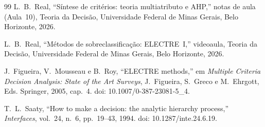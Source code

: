 \documentclass[conference]{IEEEtran}
\begin{document}
\begin{thebibliography}{99}
L.~B.~Real, ``Síntese de critérios: teoria multiatributo e AHP,'' notas de aula (Aula~10), Teoria da Decisão, Universidade Federal de Minas Gerais, Belo Horizonte, 2026.

L.~B.~Real, ``Métodos de sobreclassificação: ELECTRE~I,'' videoaula, Teoria da Decisão, Universidade Federal de Minas Gerais, Belo Horizonte, 2026.

J.~Figueira, V.~Mousseau e B.~Roy, ``ELECTRE methods,'' em \textit{Multiple Criteria Decision Analysis: State of the Art Surveys}, J.~Figueira, S.~Greco e M.~Ehrgott, Eds. Springer, 2005, cap.~4. doi: 10.1007/0-387-23081-5\_4.

T.~L.~Saaty, ``How to make a decision: the analytic hierarchy process,'' \textit{Interfaces}, vol.~24, n.~6, pp.~19--43, 1994. doi: 10.1287/inte.24.6.19.

\end{thebibliography}
\end{document}
